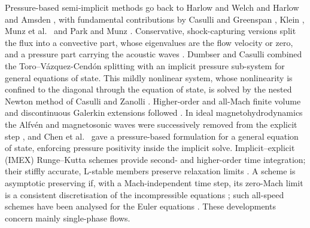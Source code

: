 \documentclass[a4paper,fleqn]{cas-sc}
\begin{document}
Pressure-based semi-implicit methods go back to Harlow and Welch \cite{HarlowWelch1965} and Harlow and Amsden
\cite{HarlowAmsden1971}, with fundamental contributions by Casulli and Greenspan \cite{CasulliGreenspan1984}, Klein
\cite{Klein1995}, Munz et al.\ \cite{Munz2003} and Park and Munz \cite{ParkMunz2005}. Conservative, shock-capturing
versions split the flux into a convective part, whose eigenvalues are the flow velocity or zero, and a pressure part carrying the acoustic
waves \cite{ZhaBilgen1993,LiouSteffen1993,ToroVazquez2012}. Dumbser and Casulli \cite{DumbserCasulli2016} combined the
Toro--V\'azquez-Cend\'on splitting with an implicit pressure sub-system for general equations of state. This mildly
nonlinear system, whose nonlinearity is confined to the diagonal through the equation of state, is solved by the nested
Newton method of Casulli and Zanolli \cite{CasulliZanolli2012}. Higher-order and all-Mach finite volume and
discontinuous Galerkin extensions followed
\cite{TavelliDumbser2017,Boscheri2020,BoscheriPareschi2021,BoscheriTavelli2022,Boscarino2022,Orlando2022}. In ideal
magnetohydrodynamics the Alfv\'en and magnetosonic waves were successively removed from the explicit step
\cite{Dumbser2019,Fambri2021,BoscheriThomann2024,Dematte2024}, and Chen et al.\ \cite{Chen2026} gave a pressure-based
formulation for a general equation of state, enforcing pressure positivity inside the implicit solve. Implicit--explicit
(IMEX) Runge--Kutta schemes \cite{Ascher1997,PareschiRusso2005} provide second- and higher-order time integration; their
stiffly accurate, L-stable members preserve relaxation limits
\cite{PareschiRusso2005,BoscarinoRusso2009,BoscarinoPareschiRusso2017}. A scheme is asymptotic preserving if, with a
Mach-independent time step, its zero-Mach limit is a consistent discretisation of the incompressible equations
\cite{Jin1999,KlainermanMajda1981}; such all-speed schemes have been analysed for the Euler equations
\cite{DegondTang2011,HaackJinLiu2012,Cordier2012,Noelle2014,Dimarco2018,Boscheri2020}. These developments concern mainly
single-phase flows.
\end{document}
